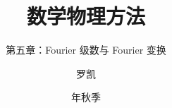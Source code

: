 \documentclass[fontset=fandol,10pt]{ctexbeamer}
\title{数学物理方法}
\subtitle{第五章：Fourier 级数与 Fourier 变换}
\author{罗凯}
\institute{南京理工大学物理学院}
\date{\zhdigits{2026}年秋季}
\begin{document}
\chaptertitleframe
\chapteroutline

\end{document}
